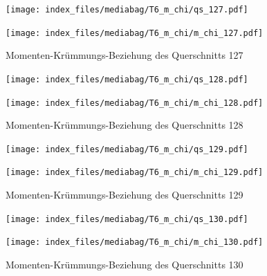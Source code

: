 \documentclass[
  11pt,
  letterpaper,
]{scrreprt}
\begin{document}
\begin{figure}[H]

\begin{minipage}{0.50\linewidth}
\texttt{[image: index\_files/mediabag/T6\_m\_chi/qs\_127.pdf]}\end{minipage}%
%
\begin{minipage}{0.50\linewidth}
\texttt{[image: index\_files/mediabag/T6\_m\_chi/m\_chi\_127.pdf]}\end{minipage}%

\caption{\label{fig-mchi_anhang}Momenten-Krümmungs-Beziehung des
Querschnitts 127}

\end{figure}%

\begin{figure}[H]

\begin{minipage}{0.50\linewidth}
\texttt{[image: index\_files/mediabag/T6\_m\_chi/qs\_128.pdf]}\end{minipage}%
%
\begin{minipage}{0.50\linewidth}
\texttt{[image: index\_files/mediabag/T6\_m\_chi/m\_chi\_128.pdf]}\end{minipage}%

\caption{\label{fig-mchi_anhang}Momenten-Krümmungs-Beziehung des
Querschnitts 128}

\end{figure}%

\begin{figure}[H]

\begin{minipage}{0.50\linewidth}
\texttt{[image: index\_files/mediabag/T6\_m\_chi/qs\_129.pdf]}\end{minipage}%
%
\begin{minipage}{0.50\linewidth}
\texttt{[image: index\_files/mediabag/T6\_m\_chi/m\_chi\_129.pdf]}\end{minipage}%

\caption{\label{fig-mchi_anhang}Momenten-Krümmungs-Beziehung des
Querschnitts 129}

\end{figure}%

\begin{figure}[H]

\begin{minipage}{0.50\linewidth}
\texttt{[image: index\_files/mediabag/T6\_m\_chi/qs\_130.pdf]}\end{minipage}%
%
\begin{minipage}{0.50\linewidth}
\texttt{[image: index\_files/mediabag/T6\_m\_chi/m\_chi\_130.pdf]}\end{minipage}%

\caption{\label{fig-mchi_anhang}Momenten-Krümmungs-Beziehung des
Querschnitts 130}

\end{figure}%
\end{document}
